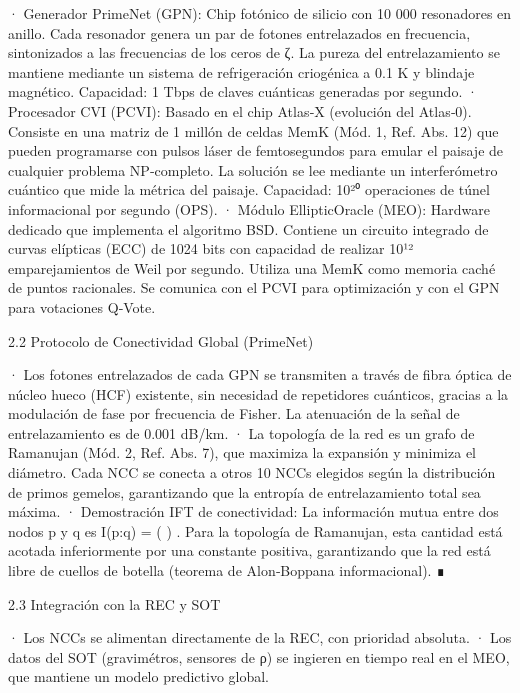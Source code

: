 \documentclass[12pt,twoside]{book}
\begin{document}
· Generador PrimeNet (GPN): Chip fotónico de silicio con 10 000 resonadores en anillo. Cada resonador genera un par de fotones entrelazados en frecuencia, sintonizados a las frecuencias de los ceros de ζ. La pureza del entrelazamiento se mantiene mediante un sistema de refrigeración criogénica a 0.1 K y blindaje magnético. Capacidad: 1 Tbps de claves cuánticas generadas por segundo.
· Procesador CVI (PCVI): Basado en el chip Atlas‑X (evolución del Atlas‑0). Consiste en una matriz de 1 millón de celdas MemK (Mód. 1, Ref. Abs. 12) que pueden programarse con pulsos láser de femtosegundos para emular el paisaje de cualquier problema NP‑completo. La solución se lee mediante un interferómetro cuántico que mide la métrica del paisaje. Capacidad: 10²⁰ operaciones de túnel informacional por segundo (OPS).
· Módulo EllipticOracle (MEO): Hardware dedicado que implementa el algoritmo BSD. Contiene un circuito integrado de curvas elípticas (ECC) de 1024 bits con capacidad de realizar 10¹² emparejamientos de Weil por segundo. Utiliza una MemK como memoria caché de puntos racionales. Se comunica con el PCVI para optimización y con el GPN para votaciones Q‑Vote.

2.2 Protocolo de Conectividad Global (PrimeNet)

· Los fotones entrelazados de cada GPN se transmiten a través de fibra óptica de núcleo hueco (HCF) existente, sin necesidad de repetidores cuánticos, gracias a la modulación de fase por frecuencia de Fisher. La atenuación de la señal de entrelazamiento es de 0.001 dB/km.
· La topología de la red es un grafo de Ramanujan (Mód. 2, Ref. Abs. 7), que maximiza la expansión y minimiza el diámetro. Cada NCC se conecta a otros 10 NCCs elegidos según la distribución de primos gemelos, garantizando que la entropía de entrelazamiento total sea máxima.
· Demostración IFT de conectividad: La información mutua entre dos nodos p y q es  I(p:q) = \ln\left(  \right) . Para la topología de Ramanujan, esta cantidad está acotada inferiormente por una constante positiva, garantizando que la red está libre de cuellos de botella (teorema de Alon‑Boppana informacional). ∎

2.3 Integración con la REC y SOT

· Los NCCs se alimentan directamente de la REC, con prioridad absoluta.
· Los datos del SOT (gravimétros, sensores de ρ) se ingieren en tiempo real en el MEO, que mantiene un modelo predictivo global.
\end{document}
